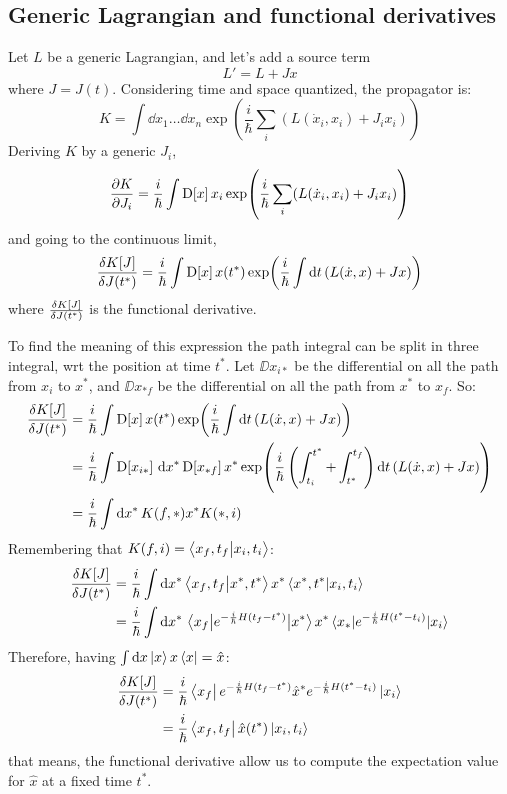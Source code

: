 \documentclass[main.tex]{subfiles}
\begin{document}
\subsection{Generic Lagrangian and functional derivatives}
Let $L$ be a generic Lagrangian, and let's add a source term
\begin{equation}
L' = L + Jx
\end{equation}
where $J=J(t)$. Considering time and space quantized, the propagator is:
\begin{equation}
K = \int \dd{x_1}\dots\dd{x_n} \exp(\frac{i}{\hbar} \sum_i (L(\dot{x}_i,x_i) + J_i x_i) )
\end{equation}
Deriving $K$ by a generic $J_i$,
\begin{equation}
\pdv{K}{J_i} = \frac{i}{\hbar}\int \text{D[$x$]}\, x_i \exp( \frac{i}{\hbar} \sum_i (L(\dot{x}_i,x_i) + J_i x_i) ) 
\end{equation}
and going to the continuous limit,
\begin{equation}
\fdv{K[J]}{J(t^*)} = \frac{i}{\hbar}\int \DD{x} x(t^*) \exp(\frac{i}{\hbar} \int \dd{t} (L(\dot{x},x) + J x) )
\end{equation}
where $\fdv{K[J]}{J(t^*)}$ is the functional derivative.

To find the meaning of this expression the path integral can be split in three integral, wrt the position at time $t^*$. Let $\DD{x_{i*}}$ be the differential on all the path from $x_i$ to $x^*$, and $\DD{x_{*f}}$ be the differential on all the path from $x^*$ to $x_f$. So:
\begin{align}
\fdv{K[J]}{J(t^*)} &= \frac{i}{\hbar}\int \DD{x} x(t^*) \exp(\frac{i}{\hbar} \int \dd{t} (L(\dot{x},x) + J x) ) \\
				   &= \frac{i}{\hbar}\int \DD{x_{i*}} \dd{x^*} \DD{x_{*f}} x^* \exp(\frac{i}{\hbar} \left(\int_{t_i}^{t^*} + \int_{t^*}^{t_f} \right) \dd{t} (L(\dot{x},x) + J x) ) \\
				   &= \frac{i}{\hbar}\int \dd{x^*} K(f,*) x^* K(*,i)
\end{align}
Remembering that $K(f,i) = \braket{x_f,t_f}{x_i,t_i}$:
\begin{align}
\fdv{K[J]}{J(t^*)} &= \frac{i}{\hbar}\int \dd{x^*} \braket{x_f,t_f}{x^*,t^*} x^* \braket{x^*,t^*}{x_i,t_i} \\
	&= \frac{i}{\hbar}\int \dd{x^*} \mel{x_f}{e^{-\frac{i}{\hbar}H(t_f-t^*)}}{x^*} x^* \mel{x_*}{e^{-\frac{i}{\hbar}H(t^*-t_i)}}{x_i}
\end{align}
Therefore, having $\int \dd{x} \ket{x} x \bra{x} = \hat{x}$:
\begin{align}
\fdv{K[J]}{J(t^*)} &= \frac{i}{\hbar}\bra{x_f} e^{-\frac{i}{\hbar}H(t_f-t^*)} \hat{x}^* e^{-\frac{i}{\hbar}H(t^*-t_i)} \ket{x_i} \\
	&= \frac{i}{\hbar}\bra{x_f,t_f} \hat{x}(t^*) \ket{x_i,t_i}
\end{align}
that means, the functional derivative allow us to compute the expectation value for $\hat{x}$ at a fixed time $t^*$.
\end{document}
